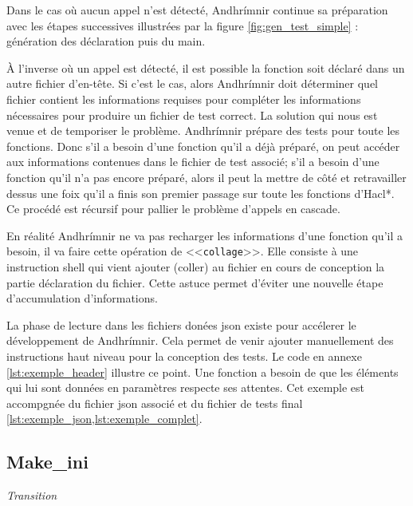 Dans le cas où aucun appel n'est détecté, Andhrímnir continue sa préparation avec les étapes successives illustrées par la figure \ref{fig:gen_test_simple} : génération des déclaration puis du main.\smallbreak

À l'inverse où un appel est détecté, il est possible la fonction soit déclaré dans un autre fichier d'en-tête. Si c'est le cas, alors Andhrímnir doit déterminer quel fichier contient les informations requises pour compléter les informations nécessaires pour produire un fichier de test correct. La solution qui nous est venue et de temporiser le problème. Andhrímnir prépare des tests pour toute les fonctions. Donc s'il a besoin d'une fonction qu'il a déjà préparé, on peut accéder aux informations contenues dans le fichier de test associé; s'il a besoin d'une fonction qu'il n'a pas encore préparé, alors il peut la mettre de côté et retravailler dessus une foix qu'il a finis son premier passage sur toute les fonctions d'Hacl*. Ce procédé est récursif pour pallier le problème d'appels en cascade.\smallbreak

En réalité Andhrímnir ne va pas recharger les informations d'une fonction qu'il a besoin, il va faire cette opération de <<\texttt{collage}>>. Elle consiste à une instruction shell qui vient ajouter (coller) au fichier en cours de conception la partie déclaration du fichier. Cette astuce permet d'éviter une nouvelle étape d'accumulation d'informations.\medbreak

La phase de lecture dans les fichiers donées json existe pour accélerer le développement de Andhrímnir. Cela permet de venir ajouter manuellement des instructions haut niveau pour la conception des tests. Le code en annexe \ref{lst:exemple_header} illustre ce point. Une fonction a besoin de que les éléments qui lui sont données en paramètres respecte ses attentes. Cet exemple est accompgnée du fichier json associé et du fichier de tests final \ref{lst:exemple_json,lst:exemple_complet}.  


\subsection*{Make\_ini}



\vfill
\textit{Transition}